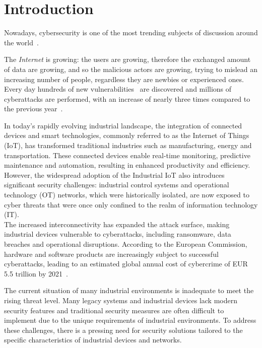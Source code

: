 \chapter{Introduction}
\label{cha:intro}

Nowadays, cybersecurity is one of the most trending subjects of discussion around the world~\cite{trends-computer-science}.

The \textit{Internet} is growing: the users are growing, therefore the exchanged amount of data are growing, and so the malicious actors are growing, trying to mislead an increasing number of people, regardless they are newbies or experienced ones. Every day hundreds of new vulnerabilities~\cite{cve-details-db} are discovered and millions of cyberattacks are performed, with an increase of nearly three times compared to the previous year~\cite{cybersecurity-attacks}.

In today's rapidly evolving industrial landscape, the integration of connected devices and smart technologies, commonly referred to as the Internet of Things (IoT), has transformed traditional industries such as manufacturing, energy and transportation. These connected devices enable real-time monitoring, predictive maintenance and automation, resulting in enhanced productivity and efficiency. \\
However, the widespread adoption of the Industrial IoT also introduces significant security challenges: industrial control systems and operational technology (OT) networks, which were historically isolated, are now exposed to cyber threats that were once only confined to the realm of information technology (IT). \\
The increased interconnectivity has expanded the attack surface, making industrial devices vulnerable to cyberattacks, including ransomware, data breaches and operational disruptions. According to the European Commission, hardware and software products are increasingly subject to successful cyberattacks, leading to an estimated global annual cost of cybercrime of EUR 5.5 trillion by 2021~\cite{cra-eu}.

The current situation of many industrial environments is inadequate to meet the rising threat level. Many legacy systems and industrial devices lack modern security features and traditional security measures are often difficult to implement due to the unique requirements of industrial environments. To address these challenges, there is a pressing need for security solutions tailored to the specific characteristics of industrial devices and networks.

